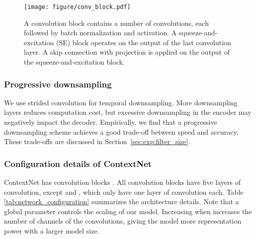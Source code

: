 \documentclass[a4paper]{article}
\newcommand{\netname}{ContextNet}
\begin{document}
\begin{figure}
    \centering
    \texttt{[image: figure/conv\_block.pdf]}
    \caption{A convolution block  contains a number of convolutions, each followed by batch normalization and activation. A squeeze-and-excitation (SE) block operates on the output of the last convolution layer. A skip connection with projection is applied on the output of the squeeze-and-excitation block. }
    \label{fig:conv_block}
\end{figure}

\vspace{-0.05in}
\subsubsection{Progressive downsampling}
We use strided convolution for temporal downsampling. More downsampling layers reduces computation cost, but excessive downsampling in the encoder may negatively impact the decoder. Empirically, we find that a progressive  downsampling scheme achieves a good trade-off between speed and accuracy. These trade-offs are discussed in Section~\ref{sec:exp:filter_size}.

\vspace{-0.05in}
\subsubsection{Configuration details of \netname}
\vspace{-0.02in}
\label{sec:model:details}
\netname{} has  convolution blocks . All convolution blocks have five layers of convolution, except  and , which only have one layer of convolution each. Table \ref{tab:network_configuration} summarizes the architecture details.
Note that a global parameter  controls the scaling of our model. Increasing  when  increases the number of channels of the convolutions, giving the model more representation power with a larger model size.
\end{document}
